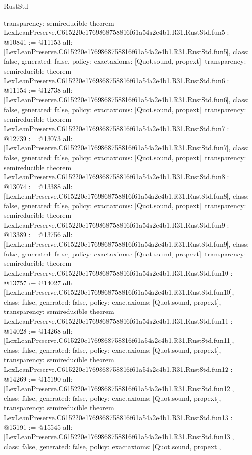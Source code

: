 \begin{lexlean}{RustStd}
\begin{coremodule}
{  transparency: semireducible
}
theorem LexLeanPreserve.C615220e1769868758816f61a54a2e4b1.R31.RustStd.fun5 : @10841 := @11153 {
  all: [LexLeanPreserve.C615220e1769868758816f61a54a2e4b1.R31.RustStd.fun5],
  class: false,
  generated: false,
  policy: exact{axioms: [Quot.sound, propext]},
  transparency: semireducible
}
theorem LexLeanPreserve.C615220e1769868758816f61a54a2e4b1.R31.RustStd.fun6 : @11154 := @12738 {
  all: [LexLeanPreserve.C615220e1769868758816f61a54a2e4b1.R31.RustStd.fun6],
  class: false,
  generated: false,
  policy: exact{axioms: [Quot.sound, propext]},
  transparency: semireducible
}
theorem LexLeanPreserve.C615220e1769868758816f61a54a2e4b1.R31.RustStd.fun7 : @12739 := @13073 {
  all: [LexLeanPreserve.C615220e1769868758816f61a54a2e4b1.R31.RustStd.fun7],
  class: false,
  generated: false,
  policy: exact{axioms: [Quot.sound, propext]},
  transparency: semireducible
}
theorem LexLeanPreserve.C615220e1769868758816f61a54a2e4b1.R31.RustStd.fun8 : @13074 := @13388 {
  all: [LexLeanPreserve.C615220e1769868758816f61a54a2e4b1.R31.RustStd.fun8],
  class: false,
  generated: false,
  policy: exact{axioms: [Quot.sound, propext]},
  transparency: semireducible
}
theorem LexLeanPreserve.C615220e1769868758816f61a54a2e4b1.R31.RustStd.fun9 : @13389 := @13756 {
  all: [LexLeanPreserve.C615220e1769868758816f61a54a2e4b1.R31.RustStd.fun9],
  class: false,
  generated: false,
  policy: exact{axioms: [Quot.sound, propext]},
  transparency: semireducible
}
theorem LexLeanPreserve.C615220e1769868758816f61a54a2e4b1.R31.RustStd.fun10 : @13757 := @14027 {
  all: [LexLeanPreserve.C615220e1769868758816f61a54a2e4b1.R31.RustStd.fun10],
  class: false,
  generated: false,
  policy: exact{axioms: [Quot.sound, propext]},
  transparency: semireducible
}
theorem LexLeanPreserve.C615220e1769868758816f61a54a2e4b1.R31.RustStd.fun11 : @14028 := @14268 {
  all: [LexLeanPreserve.C615220e1769868758816f61a54a2e4b1.R31.RustStd.fun11],
  class: false,
  generated: false,
  policy: exact{axioms: [Quot.sound, propext]},
  transparency: semireducible
}
theorem LexLeanPreserve.C615220e1769868758816f61a54a2e4b1.R31.RustStd.fun12 : @14269 := @15190 {
  all: [LexLeanPreserve.C615220e1769868758816f61a54a2e4b1.R31.RustStd.fun12],
  class: false,
  generated: false,
  policy: exact{axioms: [Quot.sound, propext]},
  transparency: semireducible
}
theorem LexLeanPreserve.C615220e1769868758816f61a54a2e4b1.R31.RustStd.fun13 : @15191 := @15545 {
  all: [LexLeanPreserve.C615220e1769868758816f61a54a2e4b1.R31.RustStd.fun13],
  class: false,
  generated: false,
  policy: exact{axioms: [Quot.sound, propext]},
}
\end{coremodule}
\end{lexlean}
